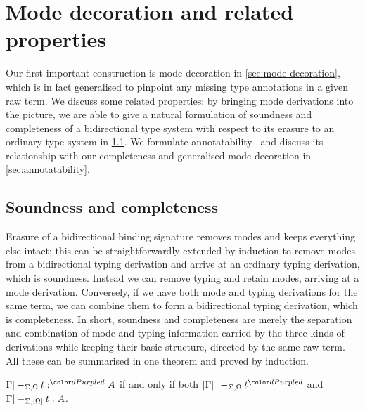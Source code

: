 
\section{Mode decoration and related properties}\label{sec:pre-synthesis}

Our first important construction is mode decoration in \cref{sec:mode-decoration}, which is in fact generalised to pinpoint any missing type annotations in a given raw term.
We discuss some related properties: by bringing mode derivations into the picture, we are able to give a natural formulation of soundness and completeness of a bidirectional type system with respect to its erasure to an ordinary type system in \cref{sec:soundness-and-completeness}.
We formulate annotatability~\cite{Dunfield2021} and discuss its relationship with our completeness and generalised mode decoration in \cref{sec:annotatability}.

\subsection{Soundness and completeness}
\label{sec:soundness-and-completeness}


Erasure of a bidirectional binding signature removes modes and keeps everything else intact; this can be straightforwardly extended by induction to remove modes from a bidirectional typing derivation and arrive at an ordinary typing derivation, which is soundness.
Instead we can remove typing and retain modes, arriving at a mode derivation.
Conversely, if we have both mode and typing derivations for the same term, we can combine them to form a bidirectional typing derivation, which is completeness.
In short, soundness and completeness are merely the separation and combination of mode and typing information carried by the three kinds of derivations while keeping their basic structure, directed by the same raw term.
All these can be summarised in one theorem and proved by induction.

\begin{theorem}\label{lem:soundness-completeness}
$\Gamma |-_{\Sigma, \Omega} t :^\dir{d} A$ if and only if both $\erase\Gamma |-_{\Sigma, \Omega} t^\dir{d}$ and $\Gamma |-_{\Sigma, \left|\Omega\right|} t : A$.
\end{theorem}

